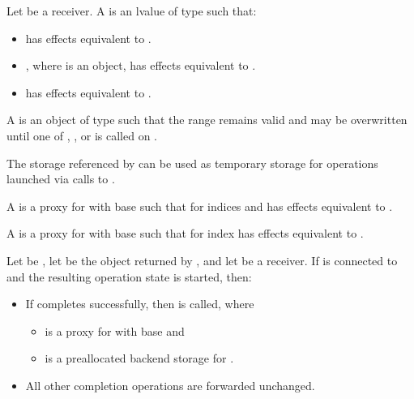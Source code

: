 \pnum
Let  be a receiver.
A  is
an lvalue  of type  such that:
\begin{itemize}
\item
{} has effects equivalent to
.
\item
{}, where  is an  object,
has effects equivalent to .
\item
{} has effects equivalent to
.
\end{itemize}

\pnum
A   is
an object  of type 
such that the range  remains valid and may be overwritten
until one of , , or 
is called on .
\begin{note}
The storage referenced by  can be used as temporary storage
for operations launched via calls to .
\end{note}

\pnum
A 
is a proxy  for 
with base 
such that
 for indices  and 
has effects equivalent to .

\pnum
A 
is a proxy  for 
with base 
such that
 for index 
has effects equivalent to .

\pnum
Let  be ,
let  be the object returned by , and
let  be a receiver.
If  is connected to  and
the resulting operation state is started, then:
\begin{itemize}
\item
If  completes successfully,
then  is called, where
\begin{itemize}
\item
{} is a proxy for 
with base  and
\item
{} is a preallocated backend storage for .
\end{itemize}
\item
All other completion operations are forwarded unchanged.
\end{itemize}

